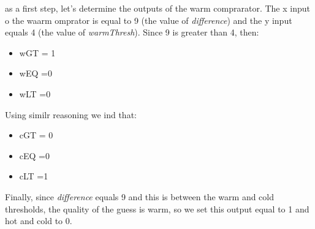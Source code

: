 as a first step, let's determine the outputs of the warm comprarator.
The x input o the waarm omprator is equal to 9 (the value of \emph{difference})
and the y input equals 4 (the value of \emph{warmThresh}). Since 9 is
greater than 4, then:
\begin{itemize}
    \item wGT = 1
    \item wEQ =0
    \item wLT =0
\end{itemize}

Using similr reasoning we ind that:
\begin{itemize}
    \item cGT = 0
    \item cEQ =0
    \item cLT =1
\end{itemize}

Finally, since \emph{difference} equals 9 and this is between the warm
and cold thresholds, the quality of the guess is warm, so we set this output
equal to 1 and hot and cold to 0.

